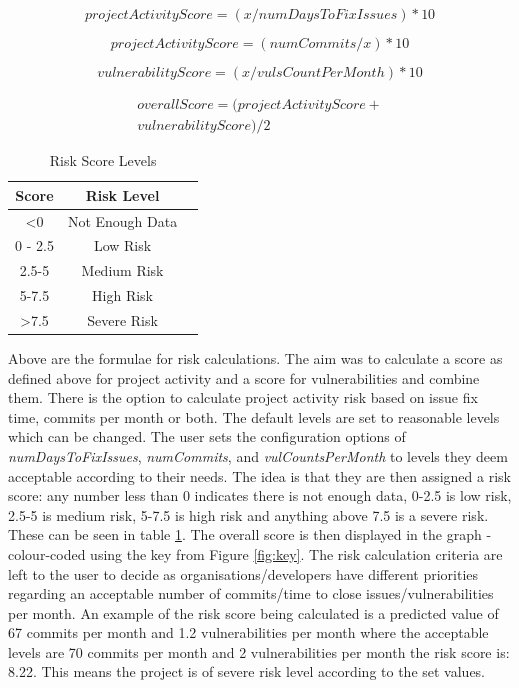\documentclass[conference]{IEEEtran}
\begin{document}
\[ projectActivityScore = ( x / numDaysToFixIssues ) * 10\]

\[ projectActivityScore = ( numCommits / x ) * 10\]

\[vulnerabilityScore = ( x / vulsCountPerMonth ) * 10\]

\begin{multline*}
  overallScore = ( projectActivityScore +\\ vulnerabilityScore) / 2 
\end{multline*}

\begin{table}
 \caption{Risk Score Levels}
\label{risklevels}
\begin{center}
\begin{tabular}{|c|c|c|}
\hline
    \textbf{Score} & \textbf{Risk Level} \\ \hline
    \textless  0 & Not Enough Data \\ \hline
    0 - 2.5 & Low Risk \\ \hline
    2.5-5 & Medium Risk \\ \hline
    5-7.5 & High Risk \\ \hline
    \textgreater 7.5  & Severe Risk \\ \hline
\end{tabular}
\end{center}
\end{table}

Above are the formulae for risk calculations. The aim was to calculate a score as defined above for project activity and a score for vulnerabilities and combine them. There is the option to calculate project activity risk based on issue fix time, commits per month or both. The default levels are set to reasonable levels which can be changed. The user sets the configuration options of \textit{numDaysToFixIssues}, \textit{numCommits}, and \textit{vulCountsPerMonth} to levels they deem acceptable according to their needs. The idea is that they are then assigned a risk score: any number less than 0 indicates there is not enough data, 0-2.5 is low risk, 2.5-5 is medium risk, 5-7.5 is high risk and anything above 7.5 is a severe risk. These can be seen in table \ref{risklevels}. The overall score is then displayed in the graph - colour-coded using the key from Figure \ref{fig:key}. The risk calculation criteria are left to the user to decide as organisations/developers have different priorities regarding an acceptable number of commits/time to close issues/vulnerabilities per month. An example of the risk score being calculated is a predicted value of 67 commits per month and 1.2 vulnerabilities per month where the acceptable levels are 70 commits per month and 2 vulnerabilities per month the risk score is: 8.22. This means the project is of severe risk level according to the set values.
\end{document}
